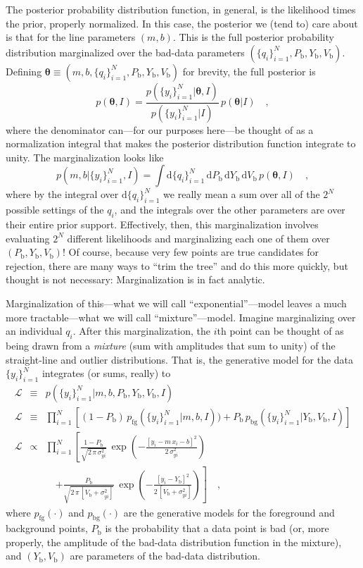 \documentclass[12pt,twoside]{article}
\newcommand{\mmatrix}[1]{\boldsymbol{#1}}
\newcommand{\parametervector}[1]{\mmatrix{#1}}
\newcommand{\pvtheta}{\parametervector{\theta}}
\newcommand{\setofall}[3]{\{{#1}\}_{{#2}}^{{#3}}}
\newcommand{\allq}{\setofall{q_i}{i=1}{N}}
\newcommand{\ally}{\setofall{y_i}{i=1}{N}}
\renewcommand{\d}{\mathrm{d}}
\newcommand{\like}{\mathscr{L}}
\newcommand{\pfg}{p_{\mathrm{fg}}}
\newcommand{\pbg}{p_{\mathrm{bg}}}
\newcommand{\Pbad}{P_{\mathrm{b}}}
\newcommand{\Ybad}{Y_{\mathrm{b}}}
\newcommand{\Vbad}{V_{\mathrm{b}}}
\begin{document}
The posterior probability distribution function, in general, is the
likelihood times the prior, properly normalized.  In this case, the
posterior we (tend to) care about is that for the line parameters
$(m,b)$.  This is the full posterior probability distribution
marginalized over the bad-data parameters $(\allq,\Pbad,\Ybad,\Vbad)$.
Defining $\pvtheta\equiv(m,b,\allq,\Pbad,\Ybad,\Vbad)$ for brevity, the
full posterior is
\begin{equation}
p(\pvtheta,I) =
 \frac{p(\ally|\pvtheta,I)}{p(\ally|I)}
 \,p(\pvtheta|I)
 \quad,
\end{equation}
where the denominator can---for our purposes here---be thought of as a
normalization integral that makes the posterior distribution function
integrate to unity.  The marginalization looks like
\begin{equation}
p(m,b|\ally,I)=\int \d\allq\,\d\Pbad\,\d\Ybad\,\d\Vbad
 \,p(\pvtheta,I) \quad,
\end{equation}
where by the integral over $\d\allq$ we really mean a sum over all of
the $2^N$ possible settings of the $q_i$, and the integrals over the
other parameters are over their entire prior support.  Effectively,
then, this marginalization involves evaluating $2^N$ different
likelihoods and marginalizing each one of them over
$(\Pbad,\Ybad,\Vbad)$!  Of course, because very few points are true
candidates for rejection, there are many ways to ``trim the tree'' and
do this more quickly, but thought is not necessary: Marginalization is
in fact analytic.

Marginalization of this---what we will call ``exponential''---model
leaves a much more tractable---what we will call ``mixture''---model.
Imagine marginalizing over an individual $q_i$.  After this
marginalization, the $i$th point can be thought of as being drawn from
a \emph{mixture} (sum with amplitudes that sum to unity) of the
straight-line and outlier distributions.  That is, the generative
model for the data $\ally$ integrates (or sums, really) to
\begin{eqnarray}\label{eq:mixture}\displaystyle
\like &\equiv& p(\ally|m,b,\Pbad,\Ybad,\Vbad,I)
 \nonumber\\
\like &\equiv& \prod_{i=1}^N
 \left[ (1-\Pbad)\,\pfg(\ally|m,b,I))
 + \Pbad\,\pbg(\ally|\Ybad,\Vbad,I) \right]
 \nonumber\\
\like &\propto&
 \prod_{i=1}^N \left[\frac{1-\Pbad}{\sqrt{2\,\pi\,\sigma_{yi}^2}}
 \,\exp\left(-\frac{[y_i-m\,x_i-b]^2}{2\,\sigma_{yi}^2}\right)\right.
 \nonumber \\ & & \quad
 \left.+ \frac{\Pbad}{\sqrt{2\,\pi\,[\Vbad+\sigma_{yi}^2]}}
 \,\exp\left(-\frac{[y_i-\Ybad]^2}{2\,[\Vbad+\sigma_{yi}^2]}\right)\right]
 \quad ,
\end{eqnarray}
where $\pfg(\cdot)$ and $\pbg(\cdot)$ are the generative models for
the foreground and background points, $\Pbad$ is the probability that
a data point is bad (or, more properly, the amplitude of the bad-data
distribution function in the mixture), and $(\Ybad,\Vbad)$ are
parameters of the bad-data distribution.
\end{document}
